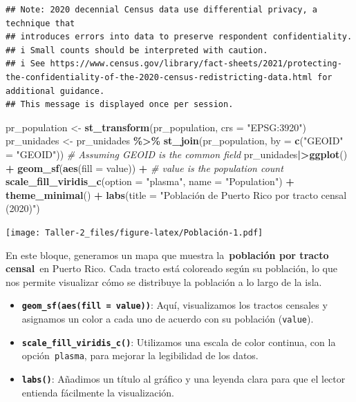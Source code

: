 \documentclass[
]{article}
\newenvironment{Shaded}{\begin{snugshade}}{\end{snugshade}}
\newcommand{\AttributeTok}[1]{\textcolor[rgb]{0.13,0.29,0.53}{#1}}
\newcommand{\CommentTok}[1]{\textcolor[rgb]{0.56,0.35,0.01}{\textit{#1}}}
\newcommand{\FunctionTok}[1]{\textcolor[rgb]{0.13,0.29,0.53}{\textbf{#1}}}
\newcommand{\NormalTok}[1]{#1}
\newcommand{\OtherTok}[1]{\textcolor[rgb]{0.56,0.35,0.01}{#1}}
\newcommand{\SpecialCharTok}[1]{\textcolor[rgb]{0.81,0.36,0.00}{\textbf{#1}}}
\newcommand{\StringTok}[1]{\textcolor[rgb]{0.31,0.60,0.02}{#1}}
\begin{document}
\begin{verbatim}
\end{verbatim}

\begin{verbatim}
## Note: 2020 decennial Census data use differential privacy, a technique that
## introduces errors into data to preserve respondent confidentiality.
## i Small counts should be interpreted with caution.
## i See https://www.census.gov/library/fact-sheets/2021/protecting-the-confidentiality-of-the-2020-census-redistricting-data.html for additional guidance.
## This message is displayed once per session.
\end{verbatim}

\begin{Shaded}
\begin{Highlighting}[]
\NormalTok{pr\_population }\OtherTok{\textless{}{-}} \FunctionTok{st\_transform}\NormalTok{(pr\_population, }\AttributeTok{crs =} \StringTok{"EPSG:3920"}\NormalTok{)}
\NormalTok{pr\_unidades }\OtherTok{\textless{}{-}}\NormalTok{ pr\_unidades }\SpecialCharTok{\%\textgreater{}\%}
  \FunctionTok{st\_join}\NormalTok{(pr\_population, }\AttributeTok{by =} \FunctionTok{c}\NormalTok{(}\StringTok{"GEOID"} \OtherTok{=} \StringTok{"GEOID"}\NormalTok{))  }\CommentTok{\# Assuming GEOID is the common field}
\NormalTok{pr\_unidades}\SpecialCharTok{|\textgreater{}}\FunctionTok{ggplot}\NormalTok{() }\SpecialCharTok{+}
  \FunctionTok{geom\_sf}\NormalTok{(}\FunctionTok{aes}\NormalTok{(}\AttributeTok{fill =}\NormalTok{ value)) }\SpecialCharTok{+}  \CommentTok{\# \textasciigrave{}value\textasciigrave{} is the population count}
  \FunctionTok{scale\_fill\_viridis\_c}\NormalTok{(}\AttributeTok{option =} \StringTok{"plasma"}\NormalTok{, }\AttributeTok{name =} \StringTok{"Population"}\NormalTok{) }\SpecialCharTok{+}
  \FunctionTok{theme\_minimal}\NormalTok{() }\SpecialCharTok{+}
  \FunctionTok{labs}\NormalTok{(}\AttributeTok{title =} \StringTok{"Población de Puerto Rico por tracto censal (2020)"}\NormalTok{)}
\end{Highlighting}
\end{Shaded}

\texttt{[image: Taller-2\_files/figure-latex/Población-1.pdf]}

En este bloque, generamos un mapa que muestra la~\textbf{población por
tracto censal}~en Puerto Rico. Cada tracto está coloreado según su
población, lo que nos permite visualizar cómo se distribuye la población
a lo largo de la isla.

\begin{itemize}
\item
  \textbf{\texttt{geom\_sf(aes(fill\ =\ value))}}: Aquí, visualizamos
  los tractos censales y asignamos un color a cada uno de acuerdo con su
  población (\texttt{value}).
\item
  \textbf{\texttt{scale\_fill\_viridis\_c()}}: Utilizamos una escala de
  color continua, con la opción~\texttt{plasma}, para mejorar la
  legibilidad de los datos.
\item
  \textbf{\texttt{labs()}}: Añadimos un título al gráfico y una leyenda
  clara para que el lector entienda fácilmente la visualización.
\end{itemize}
\end{document}
